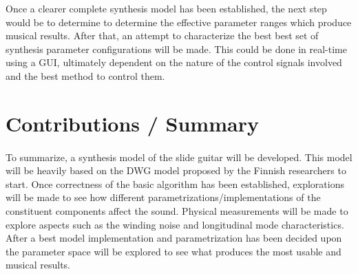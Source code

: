 \documentclass[12pt]{article}
\begin{document}
Once a clearer complete synthesis model has been established, the next step would be to determine to determine the effective parameter ranges which produce musical results. After that, an attempt to characterize the best best set of synthesis parameter configurations will be made. This could be done in real-time using a GUI, ultimately dependent on the nature of the control signals involved and the best method to control them.

\section*{Contributions / Summary}
\paragraph{}
To summarize, a synthesis model of the slide guitar will be developed. This model will be heavily based on the DWG model proposed by the Finnish researchers to start. Once correctness of the basic algorithm has been established, explorations will be made to see how different parametrizations/implementations of the constituent components affect the sound. Physical measurements will be made to explore aspects such as the winding noise and longitudinal mode characteristics. After a best model implementation and parametrization has been decided upon the parameter space will be explored to see what produces the most usable and musical results.

\clearpage


\end{document}
